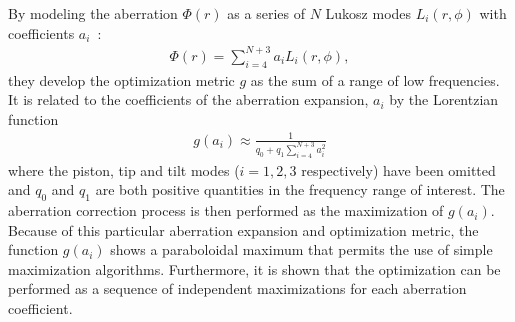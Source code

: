 \noindent By modeling the aberration $\Phi(r)$ as a series of $N$ Lukosz modes $L_i(r,\phi)$ with coefficients $a_i$~\cite{wide_Lukosz_Modes}:
\begin{align}
	\Phi(r) = \sum_{i=4}^{N+3}{a_i L_i(r,\phi)},
	\label{eq:aberration_expansion_Lukosz}
\end{align}
they develop the optimization metric $g$ as the sum of a range of low frequencies. It is related to the coefficients of the aberration expansion, $a_i$ by the Lorentzian function~\cite{wide_AOM_loew_freq}
\begin{align}
	g(a_i) \approx \frac{1}{q_0 + q_1 \sum_{i=4}^{N+3}{a_i^2}}
	\label{eq:aberration_metric}
\end{align}
where the piston, tip and tilt modes ($i = 1,2,3$ respectively) have been omitted and $q_0$ and $q_1$ are both positive quantities in the frequency range of interest. The aberration correction process is then performed as the maximization of $g(a_i)$. Because of this particular aberration expansion and  optimization metric, the function $g(a_i)$ shows a paraboloidal maximum that permits the use of simple maximization algorithms. Furthermore, it is shown that the optimization can be performed as a sequence of independent maximizations for each aberration coefficient. 

